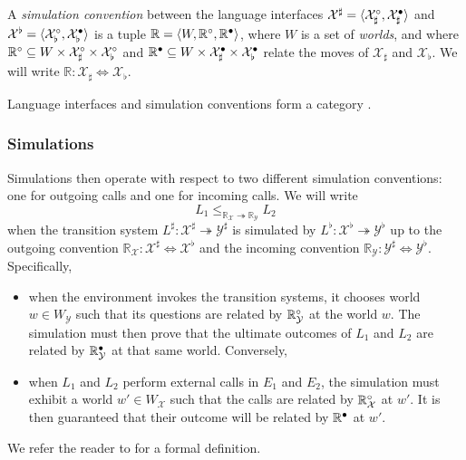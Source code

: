 \documentclass[acmsmall,review,anonymous]{acmart}\settopmatter{printfolios=true,printccs=false,printacmref=false}
\begin{document}
\begin{definition}
A \emph{simulation convention} between
the language interfaces
$\mathcal{X}^\sharp = \langle \mathcal{X}_\sharp^\circ, \mathcal{X}_\sharp^\bullet \rangle $ and
$\mathcal{X}^\flat = \langle \mathcal{X}_\flat^\circ, \mathcal{X}_\flat^\bullet \rangle $
is a tuple $\mathbb{R} = \langle W, \mathbb{R}^\circ, \mathbb{R}^\bullet \rangle$,
where $W$ is a set of \emph{worlds},
and where
$\mathbb{R}^\circ \subseteq W \times \mathcal{X}_\sharp^\circ \times \mathcal{X}_\flat^\circ$
and
$\mathbb{R}^\bullet \subseteq W \times \mathcal{X}_\sharp^\bullet \times \mathcal{X}_\flat^\bullet$
relate the moves of $\mathcal{X}_\sharp$ and $\mathcal{X}_\flat$.
We will write $\mathbb{R} : \mathcal{X}_\sharp \Leftrightarrow \mathcal{X}_\flat$.
\end{definition}

Language interfaces and simulation conventions
form a category \cite{compcerto}.


\subsubsection{Simulations} %

Simulations then operate with respect to
two different simulation conventions:
one for outgoing calls and one for incoming calls.
We will write
\[
  L_1 \le_{\mathbb{R}_\mathcal{X} \twoheadrightarrow \mathbb{R}_\mathcal{Y}} L_2
\]
when the transition system
$L^\sharp : \mathcal{X}^\sharp \twoheadrightarrow \mathcal{Y}^\sharp$
is simulated by
$L^\flat : \mathcal{X}^\flat \twoheadrightarrow \mathcal{Y}^\flat$
up to the outgoing convention
$\mathbb{R}_\mathcal{X} : \mathcal{X}^\sharp \Leftrightarrow \mathcal{X}^\flat$
and the incoming convention
$\mathbb{R}_\mathcal{Y} : \mathcal{Y}^\sharp \Leftrightarrow \mathcal{Y}^\flat$.
Specifically,
\begin{itemize}
\item
when the environment invokes the transition systems,
it chooses world $w \in W_\mathcal{Y}$
such that its questions are related by $\mathbb{R}_\mathcal{Y}^\circ$ at the world $w$.
The simulation must then prove that
the ultimate outcomes of $L_1$ and $L_2$
are related by $\mathbb{R}_\mathcal{Y}^\bullet$ at that same world.
Conversely,
\item
when $L_1$ and $L_2$ perform external calls in $E_1$ and $E_2$,
the simulation must exhibit a world $w' \in W_\mathcal{X}$
such that the calls are related by $\mathbb{R}_\mathcal{X}^\circ$ at $w'$.
It is then guaranteed that their outcome
will be related by $\mathbb{R}^\bullet$ at $w'$.
\end{itemize}
We refer the reader to \citet{compcerto}
for a formal definition.
\end{document}
